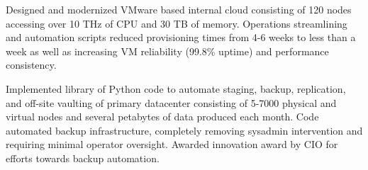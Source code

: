 \documentclass[]{deedy-resume-openfont}
\begin{document}
\begin{minipage}[t]{0.66\textwidth}
\begin{tightemize}
\item Designed and modernized VMware based internal cloud consisting of 120 nodes accessing over 10 THz of CPU and 30 TB of memory. Operations streamlining and automation scripts reduced provisioning times from 4-6 weeks to less than a week as well as increasing VM reliability (99.8\% uptime) and performance consistency.
\item Implemented library of Python code to automate staging, backup, replication, and off-site vaulting of primary datacenter consisting of 5-7000 physical and virtual nodes and several petabytes of data produced each month. Code automated backup infrastructure, completely removing sysadmin intervention and requiring minimal operator oversight. Awarded innovation award by CIO for efforts towards backup automation.
\end{tightemize}
\end{minipage}
\newpage
\end{document}
